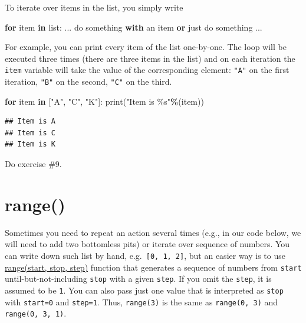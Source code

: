 \documentclass[
]{book}
\newenvironment{Shaded}{\begin{snugshade}}{\end{snugshade}}
\newcommand{\BuiltInTok}[1]{#1}
\newcommand{\ControlFlowTok}[1]{\textcolor[rgb]{0.13,0.29,0.53}{\textbf{#1}}}
\newcommand{\KeywordTok}[1]{\textcolor[rgb]{0.13,0.29,0.53}{\textbf{#1}}}
\newcommand{\NormalTok}[1]{#1}
\newcommand{\OperatorTok}[1]{\textcolor[rgb]{0.81,0.36,0.00}{\textbf{#1}}}
\newcommand{\SpecialCharTok}[1]{\textcolor[rgb]{0.00,0.00,0.00}{#1}}
\newcommand{\StringTok}[1]{\textcolor[rgb]{0.31,0.60,0.02}{#1}}
\begin{document}
To iterate over items in the list, you simply write

\begin{Shaded}
\begin{Highlighting}[]
\ControlFlowTok{for}\NormalTok{ item }\KeywordTok{in} \BuiltInTok{list}\NormalTok{:}
\NormalTok{  ...}
\NormalTok{  do something }\ControlFlowTok{with}\NormalTok{ an item }\KeywordTok{or}\NormalTok{ just do something}
\NormalTok{  ...}
\end{Highlighting}
\end{Shaded}

For example, you can print every item of the list one-by-one. The loop will be executed three times (there are three items in the list) and on each iteration the \texttt{item} variable will take the value of the corresponding element: \texttt{"A"} on the first iteration, \texttt{"B"} on the second, \texttt{"C"} on the third.

\begin{Shaded}
\begin{Highlighting}[]
\ControlFlowTok{for}\NormalTok{ item }\KeywordTok{in}\NormalTok{ [}\StringTok{"A"}\NormalTok{, }\StringTok{"C"}\NormalTok{, }\StringTok{"K"}\NormalTok{]:}
    \BuiltInTok{print}\NormalTok{(}\StringTok{"Item is }\SpecialCharTok{\%s}\StringTok{"}\OperatorTok{\%}\NormalTok{(item))}
\end{Highlighting}
\end{Shaded}

\begin{verbatim}
## Item is A
## Item is C
## Item is K
\end{verbatim}

Do exercise \#9.

\hypertarget{range}{%
\section{range()}\label{range}}

Sometimes you need to repeat an action several times (e.g., in our code below, we will need to add two bottomless pits) or iterate over sequence of numbers. You can write down such list by hand, e.g.~\texttt{{[}0,\ 1,\ 2{]}}, but an easier way is to use \href{https://docs.python.org/3/library/stdtypes.html\#range}{range(start, stop, step)} function that generates a sequence of numbers from \texttt{start} until-but-not-including \texttt{stop} with a given \texttt{step}. If you omit the \texttt{step}, it is assumed to be \texttt{1}. You can also pass just one value that is interpreted as \texttt{stop} with \texttt{start=0} and \texttt{step=1}. Thus, \texttt{range(3)} is the same as \texttt{range(0,\ 3)} and \texttt{range(0,\ 3,\ 1)}.
\end{document}
